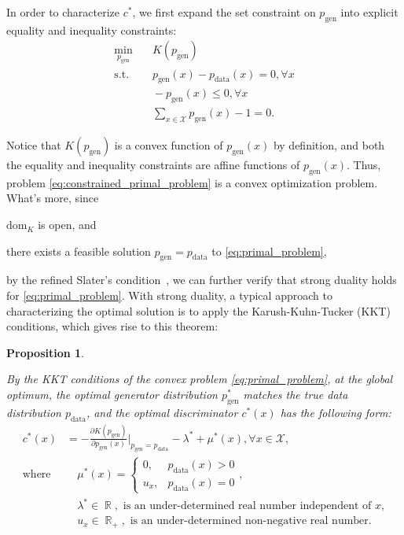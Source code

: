 \documentclass[a4paper]{article}
\newtheorem{proposition}{Proposition}[section]
\newcommand{\pd}{p_\text{data}}
\newcommand{\pg}{p_\text{gen}}
\DeclareMathOperator{\R}{\mathbb{R}}
\begin{document}
In order to characterize $c^*$, we first expand the set constraint on $\pg$ into explicit equality and inequality constraints:
\begin{equation}
\label{eq:primal_problem}
\begin{aligned}
	\min_{\pg}
    	&\quad K(\pg) \\
	\text{s.t.}
   		&\quad \pg(x) - \pd(x) = 0, \forall x \\
		&\quad -\pg(x) \leq 0, \forall x \\
		&\quad \sum_{x \in \mathcal{X}} \pg(x) - 1 = 0.
\end{aligned}
\end{equation}

Notice that $K(\pg)$ is a convex function of $\pg(x)$ by definition, and both the equality and inequality constraints are affine functions of $\pg(x)$.
Thus, problem \eqref{eq:constrained_primal_problem} is a convex optimization problem.
What's more, since 
\begin{inlinelist}
\item $\text{dom}_K$ is open, and
\item there exists a feasible solution $\pg = \pd$ to \eqref{eq:primal_problem},
\end{inlinelist}
by the refined Slater's condition~\citep[page~226]{boyd2004convex}, 
we can further verify that strong duality holds for \eqref{eq:primal_problem}.
With strong duality, a typical approach to characterizing the optimal solution is to apply the Karush-Kuhn-Tucker (KKT) conditions, which gives rise to this theorem:

\begin{proposition}
\label{thm:general_optimal_disc}

By the KKT conditions of the convex problem \eqref{eq:primal_problem}, at the global optimum, the optimal generator distribution $\pg^*$ matches the true data distribution $\pd$, and the optimal discriminator $c^*(x)$ has the following form:
\begin{equation}
\label{eq:optimal_disc}
\begin{aligned}
c^*(x) &= -\frac{\partial K(\pg)}{\partial \pg(x)}\bigg|_{\pg=\pd} - \lambda^* + \mu^*(x), \forall x \in \mathcal{X}, \\
\text{where}
	&\quad \mu^*(x) =  
		\begin{cases}
		0, & \pd(x) > 0 \\
		u_x, & \pd(x) = 0
		\end{cases}, \\
	&\quad \lambda^* \in \R,\text{ is an under-determined real number independent of } x, \\
	&\quad u_x \in \R_+,\text{ is an under-determined non-negative real number.}
\end{aligned}
\end{equation}
	
\end{proposition}
\end{document}
